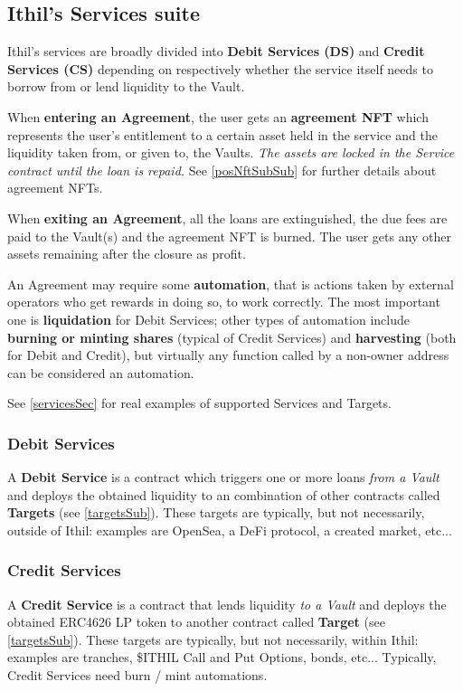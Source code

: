 \documentclass[a4paper,10 pt]{article}
\theoremstyle{definition}
\begin{document}
\subsection{Ithil's Services suite}

Ithil's services are broadly divided into {\bf Debit Services (DS)} and {\bf Credit Services (CS)} depending on respectively whether the service itself needs to borrow from or lend liquidity to the Vault.

When {\bf entering an Agreement}, the user gets an {\bf agreement NFT} which represents the user's entitlement to a certain asset held in the service and the liquidity taken from, or given to, the Vaults. {\it The assets are locked in the Service contract until the loan is repaid.} See \ref{posNftSubSub} for further details about agreement NFTs.

When {\bf exiting an Agreement}, all the loans are extinguished, the due fees are paid to the Vault(s) and the agreement NFT is burned. The user gets any other assets remaining after the closure as profit.

An Agreement may require some {\bf automation}, that is actions taken by external operators who get rewards in doing so, to work correctly. The most important one is {\bf liquidation} for Debit Services; other types of automation include {\bf burning or minting shares} (typical of Credit Services) and {\bf harvesting} (both for Debit and Credit), but virtually any function called by a non-owner address can be considered an automation.

See \ref{servicesSec} for real examples of supported Services and Targets.

\subsubsection{Debit Services}\label{debitSubSub}
A {\bf Debit Service} is a contract which triggers one or more loans {\it from a Vault} and deploys the obtained liquidity to an combination of other contracts called {\bf Targets} (see \ref{targetsSub}). These targets are typically, but not necessarily, outside of Ithil: examples are OpenSea, a DeFi protocol, a created market, etc...

\subsubsection{Credit Services}\label{creditSubSub}
A {\bf Credit Service} is a contract that lends liquidity {\it to a Vault} and deploys the obtained ERC4626 LP token to another contract called {\bf Target} (see \ref{targetsSub}). These targets are typically, but not necessarily, within Ithil: examples are tranches, \$ITHIL Call and Put Options, bonds, etc... Typically, Credit Services need burn / mint automations.
\end{document}
